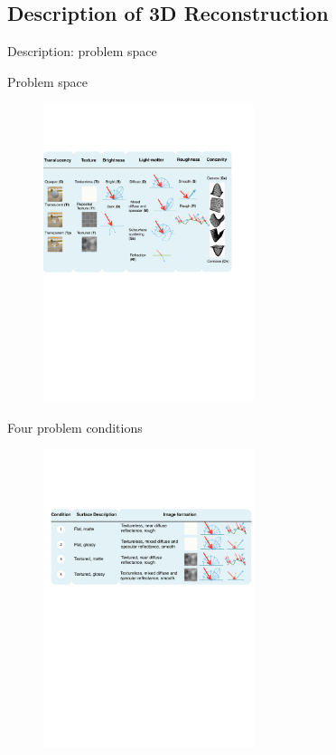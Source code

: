 \documentclass[10pt]{beamer}
\begin{document}
\subsection{Description of 3D Reconstruction}
\begin{frame}{Description: problem space}

\begin{exampleblock}{Problem space}
\end{exampleblock}
\begin{figure}
\includegraphics[width=0.55\textwidth]{prob_space/obj_class}
\end{figure}

\begin{exampleblock}{Four problem conditions}
\end{exampleblock}
\begin{figure}
\includegraphics[width=0.55\textwidth]{prob_space/prob_cond}
\end{figure}


\end{frame}
\end{document}
